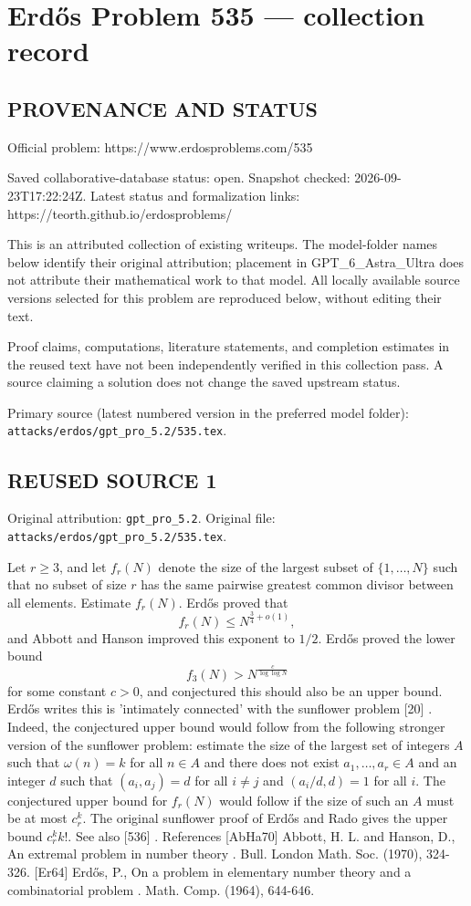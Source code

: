 \section*{Erd\H{o}s Problem 535 --- collection record}

\subsection*{PROVENANCE AND STATUS}
Official problem: https://www.erdosproblems.com/535

Saved collaborative-database status: open.
Snapshot checked: 2026-09-23T17:22:24Z.
Latest status and formalization links: https://teorth.github.io/erdosproblems/

This is an attributed collection of existing writeups. The model-folder names below identify their original attribution; placement in GPT\_6\_Astra\_Ultra does not attribute their mathematical work to that model. All locally available source versions selected for this problem are reproduced below, without editing their text.

Proof claims, computations, literature statements, and completion estimates in the reused text have not been independently verified in this collection pass. A source claiming a solution does not change the saved upstream status.

Primary source (latest numbered version in the preferred model folder): \texttt{attacks/erdos/gpt\_pro\_5.2/535.tex}.

\subsection*{REUSED SOURCE 1}
Original attribution: \texttt{gpt\_pro\_5.2}.
Original file: \texttt{attacks/erdos/gpt\_pro\_5.2/535.tex}.


Let $r\geq 3$, and let $f_r(N)$ denote the size of the largest subset of $\{1,\ldots,N\}$ such that no subset of size $r$ has the same pairwise greatest common divisor between all elements. Estimate $f_r(N)$. Erd\H{o}s \cite{Er64} proved that\[f_r(N) \leq N^{\frac{3}{4}+o(1)},\]and Abbott and Hanson \cite{AbHa70} improved this exponent to $1/2$. Erd\H{o}s \cite{Er64} proved the lower bound\[f_3(N) > N^{\frac{c}{\log\log N}}\]for some constant $c>0$, and conjectured this should also be an upper bound. Erd\H{o}s writes this is 'intimately connected' with the sunflower problem [20] . Indeed, the conjectured upper bound would follow from the following stronger version of the sunflower problem: estimate the size of the largest set of integers $A$ such that $\omega(n)=k$ for all $n\in A$ and there does not exist $a_1,\ldots,a_r\in A$ and an integer $d$ such that $(a_i,a_j)=d$ for all $i\neq j$ and $(a_i/d,d)=1$ for all $i$. The conjectured upper bound for $f_r(N)$ would follow if the size of such an $A$ must be at most $c_r^k$. The original sunflower proof of Erd\H{o}s and Rado gives the upper bound $c_r^kk!$. See also [536] . References [AbHa70] Abbott, H. L. and Hanson, D., An extremal problem in number theory . Bull. London Math. Soc. (1970), 324-326. [Er64] Erd\H{o}s, P., On a problem in elementary number theory and a combinatorial problem . Math. Comp. (1964), 644-646.


